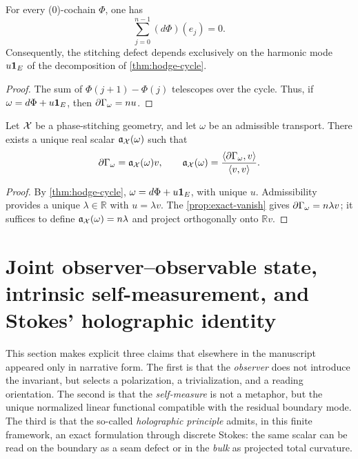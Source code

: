 \begin{proposition}
\label{prop:exact-vanish}
For every (0)-cochain \(\Phi\), one has
\[
 \sum_{j=0}^{n-1}(d\Phi)(e_j)=0.
\]
Consequently, the stitching defect depends exclusively on the harmonic
mode \(u\mathbf 1_E\) of the decomposition of \cref{thm:hodge-cycle}.
\end{proposition}

\begin{proof}
The sum of \(\Phi(j+1)-\Phi(j)\) telescopes over the cycle. Thus, if
\(\omega=d\Phi+u\mathbf 1_E\), then
\(\partial\Gamma_\omega=nu\).
\end{proof}

\begin{theorem}
\label{thm:universal-sewing}
Let \(\mathcal X\) be a phase-stitching geometry, and let \(\omega\) be an
admissible transport. There exists a unique real scalar \(\mathfrak a_\mathcal X(\omega)\) such that
\[
 \partial\Gamma_\omega=\mathfrak a_\mathcal X(\omega)v,
 \qquad
 \mathfrak a_\mathcal X(\omega)
 =\frac{\langle\partial\Gamma_\omega,v\rangle}{\langle v,v\rangle}.
\]
\end{theorem}

\begin{proof}
By \cref{thm:hodge-cycle}, \(\omega=d\Phi+u\mathbf 1_E\), with unique \(u\).
Admissibility provides a unique \(\lambda\in\mathbb R\) with
\(u=\lambda v\). The \cref{prop:exact-vanish} gives
\(\partial\Gamma_\omega=n\lambda v\); it suffices to define
\(\mathfrak a_\mathcal X(\omega)=n\lambda\) and project orthogonally onto
\(\mathbb Rv\).
\end{proof}

\section{Joint observer--observable state, intrinsic self-measurement, and Stokes' holographic identity}\label{sec:observer-holo}

This section makes explicit three claims that elsewhere in the manuscript appeared only in narrative form. The first is that the \emph{observer} does not introduce the invariant, but selects a polarization, a trivialization, and a reading orientation. The second is that the \emph{self-measure} is not a metaphor, but the unique normalized linear functional compatible with the residual boundary mode. The third is that the so-called \emph{holographic principle} admits, in this finite framework, an exact formulation through discrete Stokes: the same scalar can be read on the boundary as a seam defect or in the \emph{bulk} as projected total curvature.

